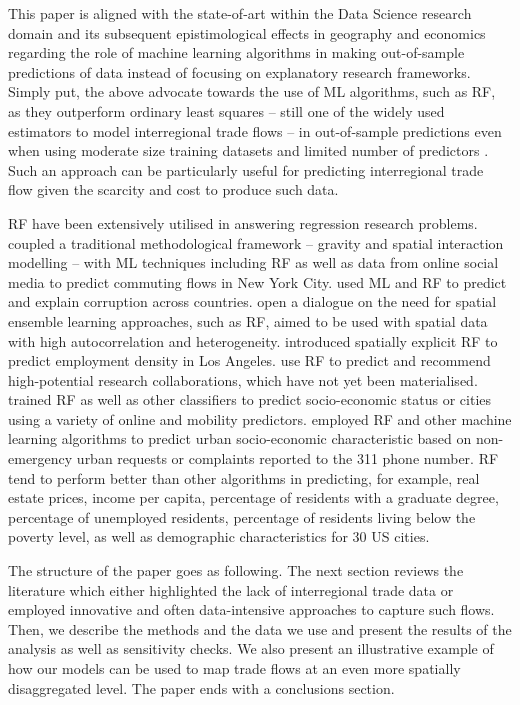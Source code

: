 \documentclass[]{interact}
\theoremstyle{plain}%
\theoremstyle{definition}
\theoremstyle{remark}
\begin{document}
This paper is aligned with the state-of-art within the Data Science
research domain and its subsequent epistimological effects in geography
\citep{singleton2021geographic, creditspatial} and economics
\citep{kleinberg2015prediction} regarding the role of machine learning
algorithms in making out-of-sample predictions of data instead of
focusing on explanatory research frameworks. Simply put, the above
advocate towards the use of ML algorithms, such as RF, as they
outperform ordinary least squares -- still one of the widely used
estimators to model interregional trade flows -- in out-of-sample
predictions even when using moderate size training datasets and limited
number of predictors \citep{mullainathan2017machine, athey2019machine}.
Such an approach can be particularly useful for predicting interregional
trade flow given the scarcity and cost to produce such data.

RF have been extensively utilised in answering regression research
problems. \citet{pourebrahim2019trip} coupled a traditional
methodological framework -- gravity and spatial interaction modelling --
with ML techniques including RF as well as data from online social media
to predict commuting flows in New York City. \citet{lima2020predicting}
used ML and RF to predict and explain corruption across countries.
\citet{sinha2019assessing} open a dialogue on the need for spatial
ensemble learning approaches, such as RF, aimed to be used with spatial
data with high autocorrelation and heterogeneity. \citet{creditspatial}
introduced spatially explicit RF to predict employment density in Los
Angeles. \citet{guns2014recommending} use RF to predict and recommend
high-potential research collaborations, which have not yet been
materialised. \citet{ren2019predicting} trained RF as well as other
classifiers to predict socio-economic status or cities using a variety
of online and mobility predictors. \citet{wang2017structure} employed RF
and other machine learning algorithms to predict urban socio-economic
characteristic based on non-emergency urban requests or complaints
reported to the 311 phone number. RF tend to perform better than other
algorithms in predicting, for example, real estate prices, income per
capita, percentage of residents with a graduate degree, percentage of
unemployed residents, percentage of residents living below the poverty
level, as well as demographic characteristics for 30 US cities.

The structure of the paper goes as following. The next section reviews
the literature which either highlighted the lack of interregional trade
data or employed innovative and often data-intensive approaches to
capture such flows. Then, we describe the methods and the data we use
and present the results of the analysis as well as sensitivity checks.
We also present an illustrative example of how our models can be used to
map trade flows at an even more spatially disaggregated level. The paper
ends with a conclusions section.
\end{document}
